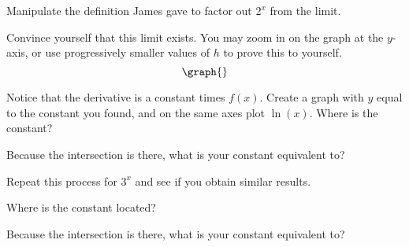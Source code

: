\documentclass{ximera}
\begin{document}
\begin{question}

Manipulate the definition James gave to factor out $2^x$ from the limit.
\begin{multipleChoice}
\end{multipleChoice}

Convince yourself that this limit exists. You may zoom in on the graph at the $y$-axis, or use progressively smaller values of $h$ to prove this to yourself.
\[
\graph{}
\]

\begin{onlineOnly}
\begin{sageCell}

\end{sageCell}
\end{onlineOnly}

Notice that the derivative is a constant times $f(x)$. Create a graph with $y$ equal to the constant you found, and on the same axes plot $\ln \left(x\right)$. Where is the constant?

\begin{multipleChoice}
\end{multipleChoice}

Because the intersection is there, what is your constant equivalent to?

\begin{multipleChoice}
\choice[correct]{$\ln\left(2\right)$}
\end{multipleChoice}

Repeat this process for $3^x$ and see if you obtain similar results.

Where is the constant located?

\begin{multipleChoice}
\end{multipleChoice}

Because the intersection is there, what is your constant equivalent to?

\begin{multipleChoice}
\choice[correct]{$\ln\left(3\right)$}
\end{multipleChoice}
\end{question}
\end{document}
